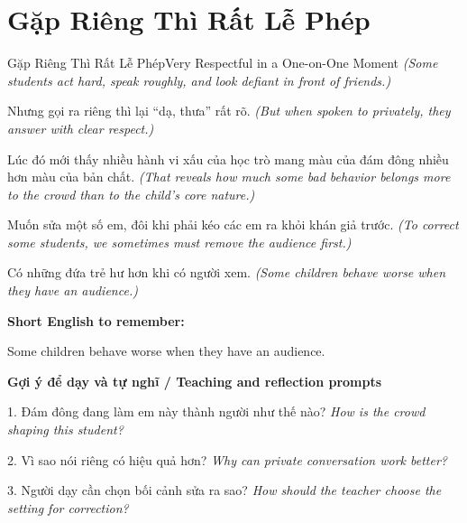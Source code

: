 \section{Gặp Riêng Thì Rất Lễ Phép}
\begin{truyen}{Gặp Riêng Thì Rất Lễ Phép}{Very Respectful in a One-on-One Moment}
\textit{(Some students act hard, speak roughly, and look defiant in front of friends.)}

Nhưng gọi ra riêng thì lại “dạ, thưa” rất rõ.
\textit{(But when spoken to privately, they answer with clear respect.)}

Lúc đó mới thấy nhiều hành vi xấu của học trò mang màu của đám đông nhiều hơn màu của bản chất.
\textit{(That reveals how much some bad behavior belongs more to the crowd than to the child’s core nature.)}

Muốn sửa một số em, đôi khi phải kéo các em ra khỏi khán giả trước.
\textit{(To correct some students, we sometimes must remove the audience first.)}

\end{truyen}

\begin{baihoc}
Có những đứa trẻ hư hơn khi có người xem.
\textit{(Some children behave worse when they have an audience.)}
\end{baihoc}

\begin{ghinhoanh}
\textbf{Short English to remember:}

Some children behave worse when they have an audience.

\end{ghinhoanh}

\begin{tuhocnhanh}
\textbf{Gợi ý để dạy và tự nghĩ / Teaching and reflection prompts}

1. Đám đông đang làm em này thành người như thế nào? \textit{How is the crowd shaping this student?}

2. Vì sao nói riêng có hiệu quả hơn? \textit{Why can private conversation work better?}

3. Người dạy cần chọn bối cảnh sửa ra sao? \textit{How should the teacher choose the setting for correction?}
\end{tuhocnhanh}
\ngancach

